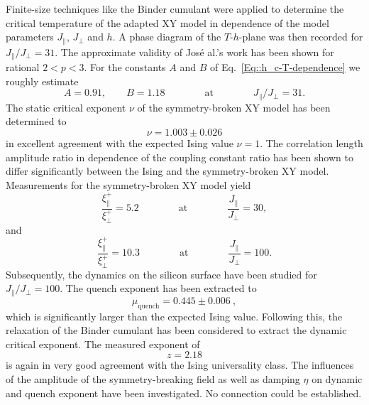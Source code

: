	Finite-size techniques like the Binder cumulant were applied to determine the critical temperature of the adapted XY model in dependence of the model parameters $J_\parallel$, $J_\perp$ and $h$. A phase diagram of the $T$-$h$-plane was then recorded for $J_\parallel / J_\perp = 31$. The approximate validity of José al.'s work \cite{jose1977renormalization} has been shown for rational $2 < p < 3$. For the constants $A$ and $B$ of Eq.~\eqref{Eq::h_c-T-dependence} we roughly estimate
	\begin{equation}
		A = 0.91, \qquad B = 1.18 \qquad \qquad \text{at} \qquad \qquad J_\parallel /	J_\perp =	31.
	\end{equation}
	The static critical exponent $\nu$ of the symmetry-broken XY model has been determined to 
	\begin{equation}
		\nu =	1.003 \pm 0.026
	\end{equation}
	in excellent agreement with the expected Ising value $\nu =	1$. The correlation length amplitude ratio in dependence of the coupling constant ratio has been shown to differ significantly between the Ising and the symmetry-broken XY model. Measurements for the symmetry-broken XY model yield
	\begin{equation}
		\frac{\xi^+_\parallel}{\xi^+_\perp} = 5.2 \qquad \qquad \text{at} \qquad \qquad \frac{J_\parallel}{J_\perp} =	30,
	\end{equation}
	and
	\begin{equation}
		\frac{\xi^+_\parallel}{\xi^+_\perp} = 10.3 \qquad \qquad \text{at} \qquad \qquad \frac{J_\parallel}{J_\perp} =	100.
	\end{equation}
	Subsequently, the dynamics on the silicon surface have been studied for $J_\parallel /	J_\perp = 100$. The quench exponent has been extracted to 
	\begin{equation}
		\mu_{\text{quench}} =	0.445 \pm 0.006~,
	\end{equation}
	which is significantly larger than the expected Ising value. Following this, the relaxation of the Binder cumulant has been considered to extract the dynamic critical exponent. The measured exponent of
	\begin{equation}
		z =	2.18
	\end{equation}	
	is again in very good agreement with the Ising universality class. The influences of the amplitude of the symmetry-breaking field as well as damping $\eta$ on dynamic and quench exponent have been investigated. No connection could be established. \\
	

